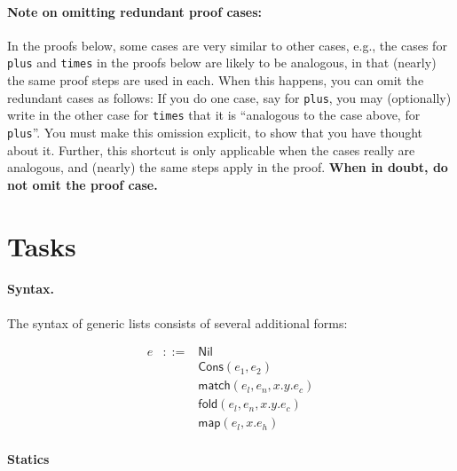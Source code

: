\documentclass[11pt]{article}
\begin{document}
\paragraph{Note on omitting redundant proof cases:} In the proofs below, some cases are very
similar to other cases, e.g., the cases for \texttt{plus} and
\texttt{times} in the proofs below are likely to be analogous, in that
(nearly) the same proof steps are used in each.
%
When this happens, you can omit the redundant cases as follows: If you
do one case, say for \texttt{plus}, you may (optionally) write in the
other case for \texttt{times} that it is ``analogous to the case
above, for \texttt{plus}''.  You must make this omission explicit, to
show that you have thought about it.  Further, this shortcut is only
applicable when the cases really are analogous, and (nearly) the same
steps apply in the proof.  \textbf{When in doubt, do not omit the
  proof case.}

\section*{Tasks}

\paragraph{Syntax.} The syntax of generic lists consists of several additional forms:

\[
\begin{array}{llll}
e & ::= & \textsf{Nil}
\\
 &&      \textsf{Cons}(e_1, e_2)
\\
 && \textsf{match}(e_l, e_n, x.y.e_c)
\\
 && \textsf{fold}(e_l, e_n, x.y.e_c)
\\
 && \textsf{map}(e_l, x.e_h)
\end{array}
\]

\newcommand{\typ}[0]{\tau}
\newcommand{\List}[1]{\textsf{List}~#1}
\newcommand{\Nil}[0]{\textsf{Nil}}
\newcommand{\Cons}[2]{\textsf{Cons}(#1, #2)}
\newcommand{\match}[3]{\textsf{match}(#1, #2, #3)}
\newcommand{\fold}[3]{\textsf{fold}(#1, #2, #3)}
\newcommand{\map}[2]{\textsf{map}(#1, #2)}

\paragraph{Statics}
\end{document}
